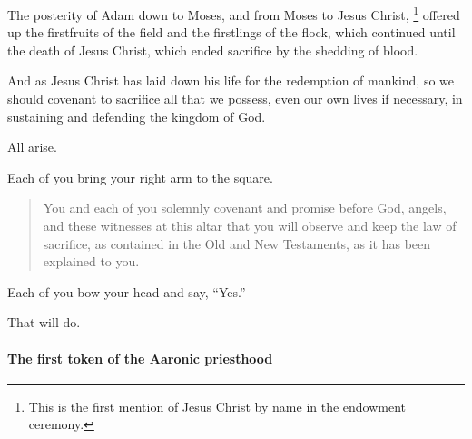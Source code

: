 				The posterity of Adam down to Moses, and from Moses to Jesus Christ,%
					\footnote{%
						\label{ENDOWMENT-first-christ}%
						This is the first mention of Jesus Christ by name in the endowment ceremony.
						}
				offered up the firstfruits of the field and the firstlings of the flock, which continued until the death of Jesus Christ, which ended sacrifice by the shedding of blood.

				And as Jesus Christ has laid down his life for the redemption of mankind, so we should covenant to sacrifice all that we possess, even our own lives if necessary, in sustaining and defending the kingdom of God.

				All arise.

				Each of you bring your right arm to the square.

				\begin{quote}
					You and each of you solemnly covenant and promise before God, angels, and these witnesses at this altar that you will observe and keep the law of sacrifice, as contained in the Old and New Testaments, as it has been explained to you.
				\end{quote}
				
				Each of you bow your head and say, ``Yes.''

				That will do.
				
			\paragraph{The first token of the Aaronic priesthood}
				\label{TEMPLE-ENDOWMENT-ENDOW-PRE-1990-FIRST-AARONIC}
			

